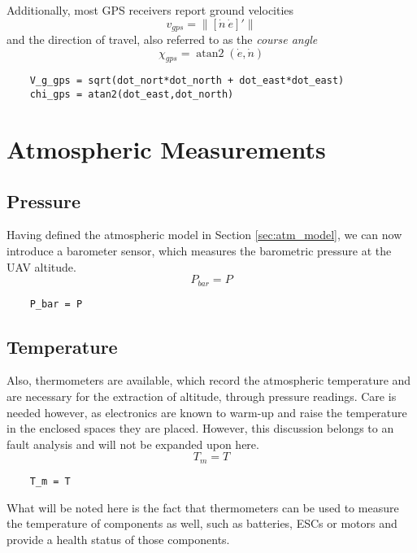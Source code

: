 Additionally, most GPS receivers report ground velocities
\begin{equation}
v_{gps} = \lVert [\dot{n}\ \dot{e}]' \rVert
\end{equation}
and the direction of travel, also referred to as the \emph{course angle}
\begin{equation}
\chi_{gps} = \operatorname{atan2}\left({\dot{e}},{\dot{n}}\right)
\end{equation}
%
\begin{lstlisting}
	V_g_gps = sqrt(dot_nort*dot_north + dot_east*dot_east)
	chi_gps = atan2(dot_east,dot_north)
\end{lstlisting}

\section{Atmospheric Measurements}

\subsection{Pressure}
Having defined the atmospheric model in Section \ref{sec:atm_model}, we can now introduce a barometer sensor, which measures the barometric pressure at the UAV altitude.
\begin{equation}
	P_{bar} = P
\end{equation}
%
\begin{lstlisting}
	P_bar = P
\end{lstlisting}

\subsection{Temperature}
Also, thermometers are available, which record the atmospheric temperature and are necessary for the extraction of altitude, through pressure readings. Care is needed however, as electronics are known to warm-up and raise the temperature in the enclosed spaces they are placed. However, this discussion belongs to an fault analysis and will not be expanded upon here.
\begin{equation}
	T_m =  T 
\end{equation}
%
\begin{lstlisting}
	T_m = T
\end{lstlisting}
%
What will be noted here is the fact that thermometers can be used to measure the temperature of components as well, such as batteries, ESCs or motors and provide a health status of those components.

